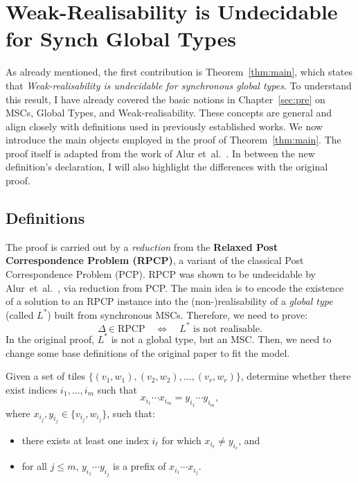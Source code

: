 \chapter{Weak-Realisability is Undecidable for Synch Global Types}\label{sec:proof}

As already mentioned, the first contribution is Theorem~\ref{thm:main},
which states that \emph{Weak-realisability is undecidable for 
synchronous global types}. 
To understand this result, I have already covered the basic notions in 
Chapter~\ref{sec:pre} on MSCs, Global Types, and Weak-realisability. 
These concepts are general and align 
closely with definitions used in previously established works. 
We now introduce the main objects employed in the proof of Theorem~\ref{thm:main}. 
The proof itself is adapted from the work of 
Alur et~al.~\cite{alur2005realizability}. 
In between the new definition's declaration, I will also highlight the 
differences with the original proof.

\section{Definitions}
The proof is carried out by a \emph{reduction} from the
\textbf{Relaxed Post Correspondence Problem (RPCP)}, a variant of
the classical Post Correspondence Problem (PCP). 
RPCP was shown to be undecidable by
Alur~et~al.~\cite{alur2005realizability}, via reduction from PCP.
The main idea is to encode the existence of a
solution to an RPCP instance into the (non-)realisability of a
\emph{global type} (called $L^*$) built from synchronous MSCs.
Therefore, we need to prove:
$$
\Delta \in \text{RPCP} \quad\iff\quad L^* \text{ is not realisable}.
$$
In the original proof, $L^*$ is not a global type, but an MSC.
Then, we need to change some base definitions of the original paper
to fit the model. 

\bigskip

\begin{definition}
	Given a set of tiles $\{(v_1, w_1), (v_2, w_2), ..., (v_r, w_r)\}$, 
	determine whether there exist indices $i_1, ..., i_m$ such that
	$$x_{i_1}\cdots x_{i_m} = y_{i_1}\cdots y_{i_m},$$
	where $x_{i_j}, y_{i_j} \in \{v_{i_j}, w_{i_j}\}$, such that:
	\begin{itemize}
		\item there exists at least one index $i_\ell$ for which $x_{i_\ell}\neq y_{i_\ell}$, and
		\item for all $j \leq m$, $y_{i_1}\cdots y_{i_j}$ is a prefix of $x_{i_1}\cdots x_{i_j}$.
	\end{itemize}
\end{definition}

